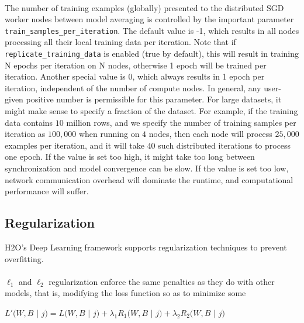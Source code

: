 \documentclass[12pt]{article}
\begin{document}
\\
The number of training examples (globally) presented to the distributed SGD worker nodes between model averaging is controlled by the important parameter \\ \texttt{train\_samples\_per\_iteration}. The default value is -1, which results in all nodes processing all their local training data per iteration. Note that if \texttt{replicate\_training\_data} is enabled (true by default), this will result in training N epochs per iteration on N nodes, otherwise 1 epoch will be trained per iteration. Another special value is 0, which always results in 1 epoch per iteration, independent of the number of compute nodes. In general, any user-given positive number is permissible for this parameter. For large datasets, it might make sense to specify a fraction of the dataset. For example, if the training data contains $10$ million rows, and we specify the number of training samples per iteration as $100,000$ when running on $4$ nodes, then each node will process $25,000$ examples per iteration, and it will take $40$ such distributed iterations to process one epoch. If the value is set too high, it might take too long between synchronization and model convergence can be slow.  If the value is set too low, network communication overhead will dominate the runtime, and computational performance will suffer.
\\
\noindent
\subsection{Regularization}
H2O's Deep Learning framework supports regularization techniques to prevent overfitting. 
\\
\\
$\ell_1$ and $\ell_2$ regularization enforce the same penalties as they do with other models, that is, modifying the loss function so as to minimize some
\\
\begin{center}
$L'(W,B$ $|$ $j) = L(W,B$ $|$ $j) + \lambda_1 R_1(W,B$ $|$ $j) + \lambda_2 R_2(W,B$ $|$ $j)$
\end{center}
\end{document}

